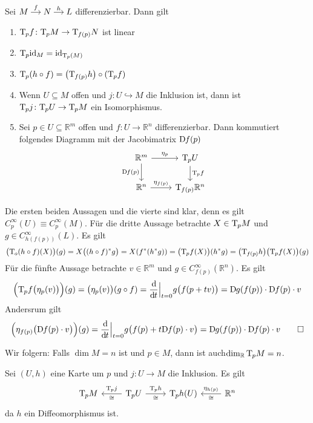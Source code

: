 \begin{lemma}
	Sei \(
		\begin{tikzcd}[sep=small,cramped]
			M \rar["f"] & N \rar["h"] & L
		\end{tikzcd}
	\)
	differenzierbar.
	Dann gilt
	\begin{enumerate}[1)]
		\item $\Tang_pf \colon \Tang_p M \to \Tang_{f(p)}N$ ist linear
		\item $\Tang_p {\id_M} = {\id_{\Tang_p(M)}}$
		\item $\Tang_p(h \circ f) = \enbrace*{\Tang_{f(p)}h} \circ \enbrace*{\Tang_pf}$
		\item Wenn $U \subseteq M$ offen und $j \colon U \hookrightarrow M$ die Inklusion ist, dann ist $\Tang_p j \colon \Tang_p U \to \Tang_p M$ ein Isomorphismus.
		\item Sei $p \in U \subseteq \mathbb{R}^m$ offen und $f \colon U \to \mathbb{R}^n$ differenzierbar.
		Dann kommutiert folgendes Diagramm mit der Jacobimatrix $\D f(p)$
		\[
			\begin{tikzcd}
				\mathbb{R}^m \rar["\eta_p"] \dar["\D f(p)"'] & \Tang_p U \dar["\Tang_p f"] \\
				\mathbb{R}^n \rar["\eta_{f(p)}"] & \Tang_{f(p)} \mathbb{R}^n
			\end{tikzcd}
		\]
	\end{enumerate}
\end{lemma}
\begin{beweis}
	Die ersten beiden Aussagen und die vierte sind klar, denn es gilt $C^\infty_p(U) \equiv C^\infty_p(M)$.
	Für die dritte Aussage betrachte $X \in \Tang_p M$ und $g \in C^\infty_{h(f(p))}(L)$.
	Es gilt
	\[
		\enbrace[\big]{\Tang_o(h \circ f)(X)}(g) = X \enbrace[\big]{(h \circ f)^* g} = X \enbrace*{f^*(h^* g)} = \enbrace[\big]{\Tang_p f(X)}(h^* g)
		= \enbrace*{\Tang_{f(p)}h} \enbrace[\big]{\Tang_p f(X)}(g)
	\]
	Für die fünfte Aussage betrachte $v \in \mathbb{R}^m$ und $g \in C^\infty_{f(p)}(\mathbb{R}^n)$.
	Es gilt
	\[
		\enbrace[\Big]{\Tang_p f \enbrace[\big]{\eta_p(v)}}(g) = \enbrace[\big]{\eta_p(v)} \enbrace*{g \circ f} = \diffd{}{t}\Big|_{t=0} g \enbrace[\big]{f(p+tv)} = \D g \enbrace*{f(p)} \cdot \D f(p) \cdot v
	\]
	Andersrum gilt
	\[
		\enbrace[\Big]{\eta_{f(p)} \enbrace[\big]{\D f(p) \cdot v}}(g) = \diffd{}{t}\Big|_{t=0} g \enbrace[\big]{f(p) + t \D f(p) \cdot v} = \D g \enbrace*{f(p)} \cdot \D f(p) \cdot v \qedhere
	\]
\end{beweis}

Wir folgern: Falls $\dim M = n$ ist und $p \in M$, dann ist auch$\dim_\mathbb{R} \Tang_p M =n$.
\begin{beweis}
	Sei $(U,h)$ eine Karte um $p$ und $j \colon U \to M$ die Inklusion.
	Es gilt
	\[
		\begin{tikzcd}
			\Tang_p M & \Tang_p U \lar["\cong","\Tang_p j"'] \rar["\Tang_p h","\cong"'] & \Tang_p h(U) & \mathbb{R}^n \lar["\eta_{h(p)}"',"\cong"]
		\end{tikzcd}
	\]
	da $h$ ein Diffeomorphismus ist.
\end{beweis}


